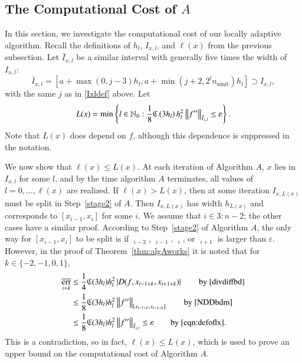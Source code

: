 \documentclass[review]{elsarticle}
\newcommand{\abstol}{\varepsilon}
\theoremstyle{definition}
\newcommand{\Ixl}{I_{x,l}}
\DeclareMathOperator{\ninit}{ninit}
\DeclareMathOperator{\oerr}{\overline{err}}
\begin{document}
\subsection{The Computational Cost of $A$} \label{subsec:appxcost}

In this section, we investigate the computational cost of our locally adaptive
algorithm. Recall the definitions of $h_l$, $\Ixl$, and $\ell(x)$ from the
previous subsection. Let
$\bar{I}_{x,l}$ be a similar interval with generally five times the
width of~$\Ixl$:
\begin{equation}
\bar{I}_{x,l}=\left[a+\max(0,j-3)h_l, a+ \min(j+2,2^l n_{\ninit})h_l\right] \supset \Ixl,
\end{equation}
with the same $j$ as in \eqref{Ixldef} above.  Let
\begin{equation}\label{eqn:defoflx}
L(x) = \min \left\{ l \in \mathbb{N}_0 :  \frac{1}{8} \fC\left(3h_l\right)h_l^2\norm[\bar{I}_{x,l}]{f''} \le \abstol \right\}.
\end{equation}
Note that $L(x)$ does depend on $f$, although this dependence is suppressed in
the notation.

We now show that $\ell(x) \le L(x)$. At each iteration of Algorithm $A$, $x$
lies in $\Ixl$ for some $l$, and by the time algorithm $A$ terminates, all
values of $l = 0, \ldots, \ell(x)$ are realized. If $\ell(x) > L(x)$, then at
some iteration $I_{x,L(x)}$ must be split in Step~\ref{stage2} of $A$. Then
$I_{x,L(x)}$ has width $h_{L(x)}$ and corresponds to $[x_{i-1},x_i]$ for some
$i$. We assume that $i \in 3\!:\!n-2$; the other cases have a similar proof.
According to Step~\ref{stage2} of Algorithm $A$, the only way for
$[x_{i-1},x_i]$ to be split is if $\oerr_{i-2}$, $\oerr_{i-1}$, $\oerr_{i}$, or
$\oerr_{i+1}$ is larger than $\abstol$. However, in the proof of 
Theorem~\ref{thm:algAworks} it is noted that for $k \in \{-2, -1, 0, 1\}$,
\begin{align}
\nonumber
\oerr_{i+k} & \le \frac{1}4 \fC(3h_l) h_l^2 \abs{D(f,x_{i-1+k},x_{i+1+k})} \qquad 
\text{by \eqref{divdiffbd}} \\
\nonumber
& \le \frac{1} 8 \fC(3h_l) h_l^2 \norm[{[x_{i-1+k},x_{i+1+k}]}]{f''}  \qquad 
\text{by \eqref{NDDbdm}}\\
& \le \frac{1} 8 \fC(3h_l) h_l^2 \norm[\bar{I}_{x,l}]{f''} \le \varepsilon \qquad 
\text{by \eqref{eqn:defoflx}}. \label{oerrbd}
\end{align}
This is a contradiction, so in fact, $\ell(x) \le L(x)$, which is used to prove an upper 
bound on the
computational cost of Algorithm $A$.
\end{document}
